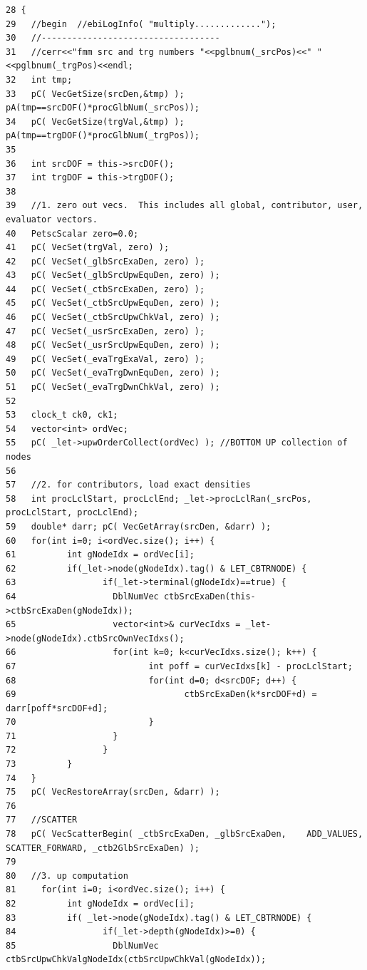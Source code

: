 \footnotesize\begin{verbatim}28 {
29   //begin  //ebiLogInfo( "multiply.............");
30   //-----------------------------------
31   //cerr<<"fmm src and trg numbers "<<pglbnum(_srcPos)<<" "<<pglbnum(_trgPos)<<endl;
32   int tmp;
33   pC( VecGetSize(srcDen,&tmp) );  pA(tmp==srcDOF()*procGlbNum(_srcPos));
34   pC( VecGetSize(trgVal,&tmp) );  pA(tmp==trgDOF()*procGlbNum(_trgPos));
35   
36   int srcDOF = this->srcDOF();
37   int trgDOF = this->trgDOF();
38   
39   //1. zero out vecs.  This includes all global, contributor, user, evaluator vectors.
40   PetscScalar zero=0.0;
41   pC( VecSet(trgVal, zero) );
42   pC( VecSet(_glbSrcExaDen, zero) );
43   pC( VecSet(_glbSrcUpwEquDen, zero) );
44   pC( VecSet(_ctbSrcExaDen, zero) );
45   pC( VecSet(_ctbSrcUpwEquDen, zero) );
46   pC( VecSet(_ctbSrcUpwChkVal, zero) );
47   pC( VecSet(_usrSrcExaDen, zero) );
48   pC( VecSet(_usrSrcUpwEquDen, zero) );
49   pC( VecSet(_evaTrgExaVal, zero) );  
50   pC( VecSet(_evaTrgDwnEquDen, zero) );
51   pC( VecSet(_evaTrgDwnChkVal, zero) );
52   
53   clock_t ck0, ck1;
54   vector<int> ordVec;
55   pC( _let->upwOrderCollect(ordVec) ); //BOTTOM UP collection of nodes
56 
57   //2. for contributors, load exact densities
58   int procLclStart, procLclEnd; _let->procLclRan(_srcPos, procLclStart, procLclEnd);
59   double* darr; pC( VecGetArray(srcDen, &darr) );
60   for(int i=0; i<ordVec.size(); i++) {
61          int gNodeIdx = ordVec[i];
62          if(_let->node(gNodeIdx).tag() & LET_CBTRNODE) {
63                 if(_let->terminal(gNodeIdx)==true) {
64                   DblNumVec ctbSrcExaDen(this->ctbSrcExaDen(gNodeIdx));
65                   vector<int>& curVecIdxs = _let->node(gNodeIdx).ctbSrcOwnVecIdxs();
66                   for(int k=0; k<curVecIdxs.size(); k++) {
67                          int poff = curVecIdxs[k] - procLclStart;
68                          for(int d=0; d<srcDOF; d++) {
69                                 ctbSrcExaDen(k*srcDOF+d) = darr[poff*srcDOF+d];
70                          }
71                   }
72                 }
73          }
74   }
75   pC( VecRestoreArray(srcDen, &darr) );
76     
77   //SCATTER
78   pC( VecScatterBegin( _ctbSrcExaDen, _glbSrcExaDen,    ADD_VALUES, SCATTER_FORWARD, _ctb2GlbSrcExaDen) );
79   
80   //3. up computation
81     for(int i=0; i<ordVec.size(); i++) {
82          int gNodeIdx = ordVec[i];
83          if( _let->node(gNodeIdx).tag() & LET_CBTRNODE) {
84                 if(_let->depth(gNodeIdx)>=0) {
85                   DblNumVec ctbSrcUpwChkValgNodeIdx(ctbSrcUpwChkVal(gNodeIdx));

\end{verbatim}

